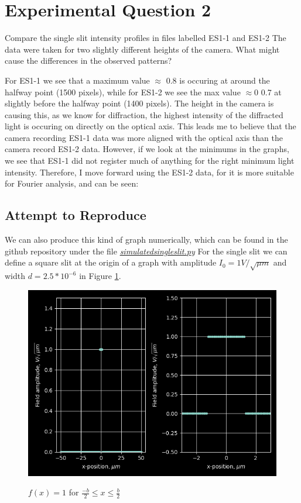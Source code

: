 \documentclass{article}
\begin{document}
\section{Experimental Question 2}
Compare the single slit intensity profiles in files labelled ES1-1 and ES1-2 The data were taken for two slightly different heights of the camera. What might cause the differences in the observed patterns?

For ES1-1 we see that a maximum value $\approx$ 0.8 is occuring at around the halfway point (1500 pixels), while for ES1-2 we see the max value $\approx0$ 0.7 at slightly before the halfway point (1400 pixels). The height in the camera is causing this, as we know for diffraction, the highest intensity of the diffracted light is occuring on directly on the optical axis. This leads me to believe that the camera recording ES1-1 data was more aligned with the optical axis than the camera record ES1-2 data. However, if we look at the minimums in the graphs, we see that ES1-1 did not register much of anything for the right minimum light intensity. Therefore, I move forward using the ES1-2 data, for it is more suitable for Fourier analysis, and can be seen:



\subsection{Attempt to Reproduce}
We can also produce this kind of graph numerically, which can be found in the github repository under the file \href{https://github.com/fusionby2030/Numerical_Methods/tree/master/Labs/017E/simulatedsingleslit.py}{\textit{simulatedsingleslit.py}}
For the single slit we can define a square slit at the origin of a graph with amplitude $ I_0 = 1 V/ \sqrt{\mu m} $ and width $d=2.5*10^{-6}$ in Figure \ref{Seen}.

\begin{figure}[h]
  \caption{$f(x) = 1$ for $\frac{-b}{2} \le x \leq\frac{b}{2}$}
  \centering
  \includegraphics[scale=0.6]{slitrepro.png}
  \label{Seen}
\end{figure}
\end{document}
